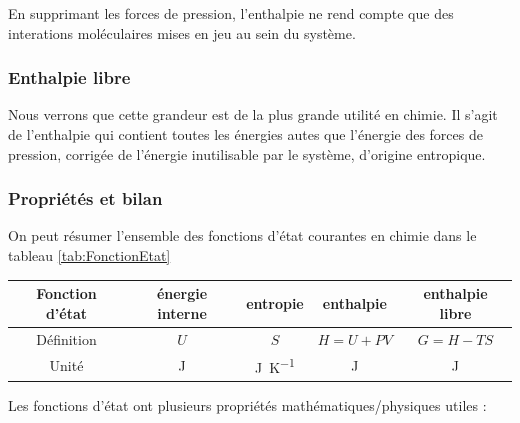 
En supprimant les forces de pression, l'enthalpie ne rend compte que des interations moléculaires mises en jeu au sein du système.

\subsubsection{Enthalpie libre}
Nous verrons que cette grandeur est de la plus grande utilité en chimie. Il s'agit de l'enthalpie qui contient toutes les énergies autes que l'énergie des forces de pression, corrigée de l'énergie inutilisable par le système, d'origine entropique.



\subsubsection{Propriétés et bilan}

On peut résumer l'ensemble des fonctions d'état courantes en chimie dans le tableau \ref{tab:FonctionEtat}
\begin{center}
\begin{tabular}{ccccc}
\toprule
Fonction d'état & énergie interne & entropie & enthalpie & enthalpie libre \\
\midrule
Définition & $U$ & $S$ & $H=U+PV$ & $G = H - TS$ \\
Unité & \si{\joule} & \si{\joule\per\kelvin} & \si{\joule} & \si{\joule} \\
\bottomrule
\end{tabular}
\label{tab:FonctionEtat}
\end{center}

Les fonctions d'état ont plusieurs propriétés mathématiques/physiques utiles : 

